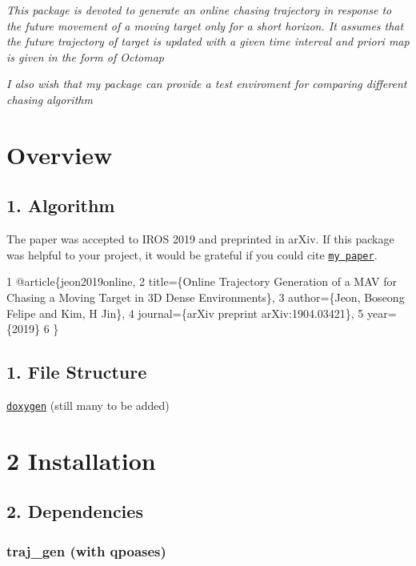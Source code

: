 



{\itshape This package is devoted to generate an online chasing trajectory in response to the future movement of a moving target only for a short horizon. It assumes that the future trajectory of target is updated with a given time interval and priori map is given in the form of Octomap}

{\itshape I also wish that my package can provide a test enviroment for comparing different chasing algorithm}

\section*{Overview}

\subsection*{1. Algorithm}



The paper was accepted to I\+R\+OS 2019 and preprinted in ar\+Xiv. If this package was helpful to your project, it would be grateful if you could cite \href{https://arxiv.org/pdf/1904.03421.pdf}{\tt my paper}.


\begin{DoxyCode}
1 @article\{jeon2019online,
2   title=\{Online Trajectory Generation of a MAV for Chasing a Moving Target in 3D Dense Environments\},
3   author=\{Jeon, Boseong Felipe and Kim, H Jin\},
4   journal=\{arXiv preprint arXiv:1904.03421\},
5   year=\{2019\}
6 \}
\end{DoxyCode}


\subsection*{1. File Structure}

\href{https://icsl-jeon.github.io/traj_gen_vis}{\tt doxygen} (still many to be added)

\section*{2 Installation}

\subsection*{2. Dependencies}

\subsubsection*{traj\+\_\+gen (with qpoases)}

